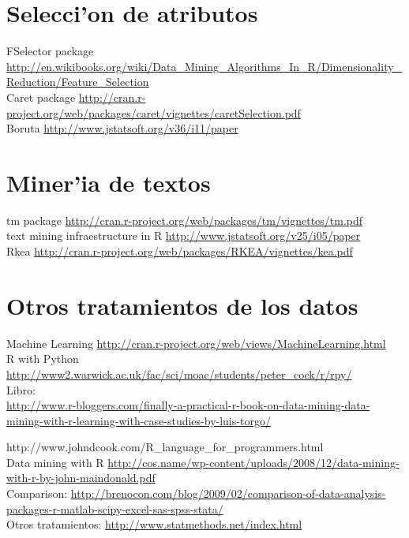 \section{Selecci'on de atributos}

FSelector package \url{http://en.wikibooks.org/wiki/Data_Mining_Algorithms_In_R/Dimensionality_Reduction/Feature_Selection}\\

Caret package \url{http://cran.r-project.org/web/packages/caret/vignettes/caretSelection.pdf}\\

Boruta \url{http://www.jstatsoft.org/v36/i11/paper}\\
\section{Miner'ia de textos}
tm package \url{http://cran.r-project.org/web/packages/tm/vignettes/tm.pdf}\\

text mining infraestructure in R \url{http://www.jstatsoft.org/v25/i05/paper}\\

Rkea \url{http://cran.r-project.org/web/packages/RKEA/vignettes/kea.pdf}\\
\section{Otros tratamientos de los datos}
Machine Learning \url{http://cran.r-project.org/web/views/MachineLearning.html}\\

R with Python \url{http://www2.warwick.ac.uk/fac/sci/moac/students/peter_cock/r/rpy/}\\


Libro:\\
\url{http://www.r-bloggers.com/finally-a-practical-r-book-on-data-mining-data-mining-with-r-learning-with-case-studies-by-luis-torgo/}


http://www.johndcook.com/R_language_for_programmers.html\\

Data mining with R \url{http://cos.name/wp-content/uploads/2008/12/data-mining-with-r-by-john-maindonald.pdf}\\

Comparison: \url{http://brenocon.com/blog/2009/02/comparison-of-data-analysis-packages-r-matlab-scipy-excel-sas-spss-stata/}\\

Otros tratamientos: \url{http://www.statmethods.net/index.html}\\

